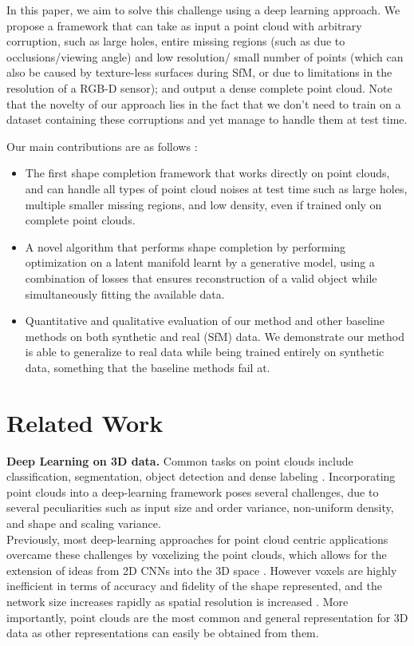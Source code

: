 \documentclass[10pt,twocolumn,letterpaper]{article}
\begin{document}
\setlength{\belowdisplayskip}{0pt} \setlength{\belowdisplayshortskip}{0pt}
\setlength{\abovedisplayskip}{0pt} \setlength{\abovedisplayshortskip}{0pt}
In this paper, we aim to solve this challenge using a deep learning approach. We propose a framework that can take as input a point cloud with arbitrary corruption, such as large holes, entire missing regions (such as due to occlusions/viewing angle) and low resolution/ small number of points (which can also be caused by texture-less surfaces during SfM, or due to limitations in the resolution of a RGB-D sensor); and output a dense complete point cloud. Note that the novelty of our approach lies in the fact that we don't need to train on a dataset containing these corruptions and yet manage to handle them at test time. 

Our main contributions are as follows :
\begin{itemize}
    \item The first shape completion framework that works directly on point clouds, and can handle all types of point cloud noises at test time such as large holes, multiple smaller missing regions, and low density, even if trained only on complete point clouds.
    \item A novel algorithm that performs shape completion by performing optimization on a latent manifold learnt by a generative model, using a combination of losses that ensures reconstruction of a valid object while simultaneously fitting the available data.
    \item Quantitative and qualitative evaluation of our method and other baseline methods on both synthetic and real (SfM) data. We demonstrate our method is able to generalize to real data while being trained entirely on synthetic data, something that the baseline methods fail at.
    
\end{itemize}
\section{Related Work}
\textbf{Deep Learning on 3D data.} Common tasks on point clouds include classification, segmentation, object detection and dense labeling \cite{segment,segment2,semantic3d,labeling,sonet}. 
Incorporating point clouds into a deep-learning framework poses several challenges, due to several peculiarities such as input size and order variance, non-uniform density, and shape and scaling variance. \\
Previously, most deep-learning approaches for point cloud centric applications overcame these challenges by voxelizing the point clouds, which allows for the extension of ideas from 2D CNNs into the 3D space \cite{voxnet} \cite{vol_multiview}. However voxels are highly inefficient in terms of accuracy and fidelity of the shape represented, and the network size increases rapidly as spatial resolution is increased \cite{octree}. More importantly, point clouds are the most common and general representation for 3D data as other representations can easily be obtained from them. 
\end{document}
